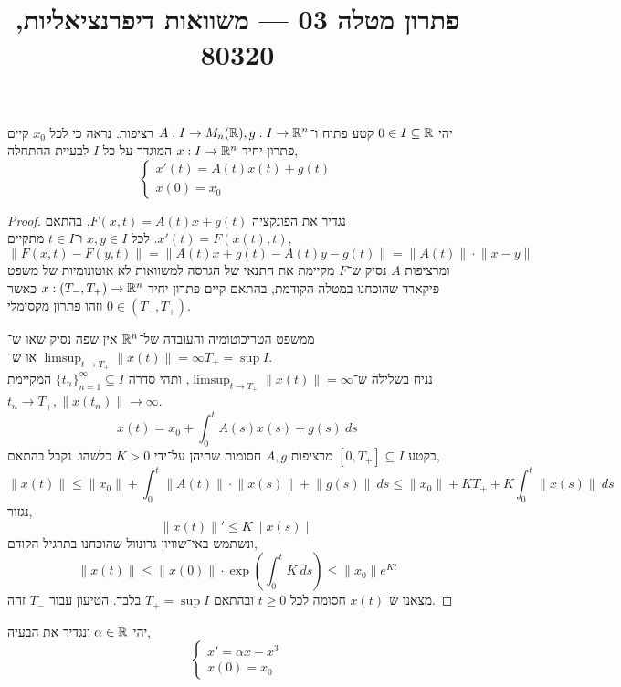 
\title{פתרון מטלה 03 --- משוואות דיפרנציאליות, 80320}

\DeclareMathOperator{\sgn}{sgn}


\maketitle
\maketitleprint[blue]{}

\question{}
יהי $0 \in I \subseteq \mathbb{R}$ קטע פתוח ו־$A : I \to M_n(\mathbb{R}), g : I \to \mathbb{R}^n$ רציפות.
נראה כי לכל $x_0$ קיים פתרון יחיד $x : I \to \mathbb{R}^n$ המוגדר על כל $I$ לבעיית ההתחלה,
\[
	\begin{cases}
		x'(t) = A(t) x(t) + g(t) \\
		x(0) = x_0
	\end{cases}
\]
\begin{proof}
	נגדיר את הפונקציה $F(x, t) = A(t) x + g(t)$, בהתאם $x'(t) = F(x(t), t)$.
	לכל $x, y \in I$ ו־$t \in I$ מתקיים,
	\[
		\lVert F(x, t) - F(y, t) \rVert
		= \lVert A(t) x + g(t) - A(t) y - g(t) \rVert
		= \lVert A(t) \rVert \cdot \lVert x - y \rVert
	\]
	ומרציפות $A$ נסיק ש־$F$ מקיימת את התנאי של הגרסה למשוואות לא אוטונומיות של משפט פיקארד שהוכחנו במטלה הקודמת, בהתאם קיים פתרון יחיד $x : (T_-, T_+) \to \mathbb{R}^n$ כאשר $0 \in (T_-, T_+)$ וזהו פתרון מקסימלי.

	ממשפט הטריכוטומיה והעובדה של־$\mathbb{R}^n$ אין שפה נסיק שאו ש־$\limsup_{t \to T_+} \lVert x(t) \rVert = \infty$ או ש־$T_+ = \sup I$. \\
	נניח בשלילה ש־$\limsup_{t \to T_+} \lVert x(t) \rVert = \infty$, ותהי סדרה ${\{ t_n \}}_{n = 1}^\infty \subseteq I$ המקיימת $t_n \to T_+, \lVert x(t_n) \rVert \to \infty$.
	\[
		x(t)
		= x_0 + \int_{0}^{t} A(s) x(s) + g(s)\ ds
	\]
	בקטע $[0, T_+] \subseteq I$ מרציפות $A, g$ חסומות שתיהן על־ידי $K > 0$ כלשהו.
	נקבל בהתאם,
	\[
		\lVert x(t) \rVert
		\le \lVert x_0 \rVert + \int_{0}^{t} \lVert A(t) \rVert \cdot \lVert x(s) \rVert + \lVert g(s) \rVert\ ds
		\le \lVert x_0 \rVert + K T_+ + K \int_{0}^{t} \lVert x(s) \rVert\ ds
	\]
	נגזור,
	\[
		\lVert x(t) \rVert'
		\le K \lVert x(s) \rVert
	\]
	ונשתמש באי־שוויון גרונוול שהוכחנו בתרגיל הקודם,
	\[
		\lVert x(t) \rVert
		\le \lVert x(0) \rVert \cdot \exp\left(\int_{0}^{t} K\ ds\right)
		\le \lVert x_0 \rVert e^{K t}
	\]
	מצאנו ש־$x(t)$ חסומה לכל $t \ge 0$ ובהתאם $T_+ = \sup I$ בלבד.
	הטיעון עבור $T_-$ זהה.
\end{proof}

\question{}
יהי $\alpha \in \mathbb{R}$ ונגדיר את הבעיה,
\[
	\begin{cases}
		x' = \alpha x - x^3 \\
		x(0) = x_0
	\end{cases}
	\tag{1}
\]

